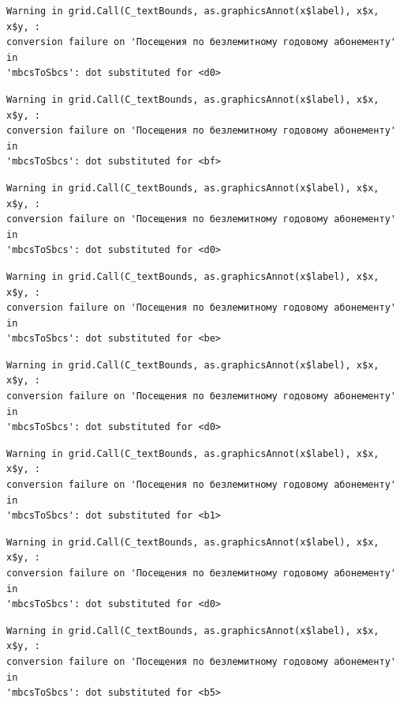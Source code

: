 \documentclass[
  letterpaper,
  DIV=11,
  numbers=noendperiod]{scrartcl}
\begin{document}
\begin{verbatim}
Warning in grid.Call(C_textBounds, as.graphicsAnnot(x$label), x$x, x$y, :
conversion failure on 'Посещения по безлемитному годовому абонементу' in
'mbcsToSbcs': dot substituted for <d0>
\end{verbatim}

\begin{verbatim}
Warning in grid.Call(C_textBounds, as.graphicsAnnot(x$label), x$x, x$y, :
conversion failure on 'Посещения по безлемитному годовому абонементу' in
'mbcsToSbcs': dot substituted for <bf>
\end{verbatim}

\begin{verbatim}
Warning in grid.Call(C_textBounds, as.graphicsAnnot(x$label), x$x, x$y, :
conversion failure on 'Посещения по безлемитному годовому абонементу' in
'mbcsToSbcs': dot substituted for <d0>
\end{verbatim}

\begin{verbatim}
Warning in grid.Call(C_textBounds, as.graphicsAnnot(x$label), x$x, x$y, :
conversion failure on 'Посещения по безлемитному годовому абонементу' in
'mbcsToSbcs': dot substituted for <be>
\end{verbatim}

\begin{verbatim}
Warning in grid.Call(C_textBounds, as.graphicsAnnot(x$label), x$x, x$y, :
conversion failure on 'Посещения по безлемитному годовому абонементу' in
'mbcsToSbcs': dot substituted for <d0>
\end{verbatim}

\begin{verbatim}
Warning in grid.Call(C_textBounds, as.graphicsAnnot(x$label), x$x, x$y, :
conversion failure on 'Посещения по безлемитному годовому абонементу' in
'mbcsToSbcs': dot substituted for <b1>
\end{verbatim}

\begin{verbatim}
Warning in grid.Call(C_textBounds, as.graphicsAnnot(x$label), x$x, x$y, :
conversion failure on 'Посещения по безлемитному годовому абонементу' in
'mbcsToSbcs': dot substituted for <d0>
\end{verbatim}

\begin{verbatim}
Warning in grid.Call(C_textBounds, as.graphicsAnnot(x$label), x$x, x$y, :
conversion failure on 'Посещения по безлемитному годовому абонементу' in
'mbcsToSbcs': dot substituted for <b5>
\end{verbatim}
\end{document}
